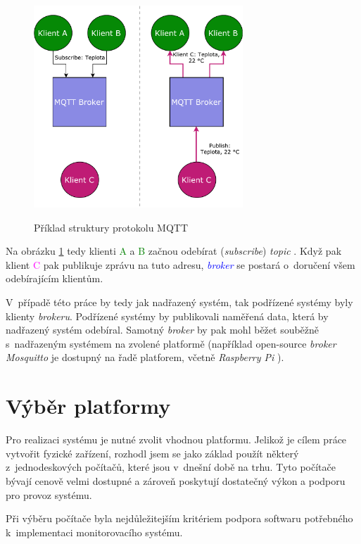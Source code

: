 \begin{figure}[h!]
    \centering
    \includegraphics[width=0.7\textwidth]{images/basic_mqtt.pdf}
    \label{fig:basic_mqtt}
    \caption[Příklad struktury protokolu MQTT]{Příklad struktury protokolu MQTT \cite{mqtt_eclipse}}
\end{figure}

Na obrázku \ref{fig:basic_mqtt} tedy klienti \textcolor{green}{A} a \textcolor{green}{B} začnou odebírat (\textit{subscribe}) \textit{topic} . Když pak klient \textcolor{magenta}{C} pak publikuje zprávu na tuto adresu, \textcolor{blue}{\textit{broker}} se postará o~doručení všem odebírajícím klientům.

V~případě této práce by tedy jak nadřazený systém, tak podřízené systémy byly klienty \textit{brokeru}. Podřízené systémy by publikovali naměřená data, která by nadřazený systém odebíral. Samotný \textit{broker} by pak mohl běžet souběžně s~nadřazeným systémem na zvolené platformě (například open-source \textit{broker Mosquitto} je dostupný na řadě platforem, včetně \textit{Raspberry Pi} \cite{mqtt_mosquitto_wiki}).

\section{Výběr platformy}

Pro realizaci systému je nutné zvolit vhodnou platformu. Jelikož je cílem práce vytvořit fyzické zařízení, rozhodl jsem se jako základ použít některý z~jednodeskových počítačů, které jsou v~dnešní době na trhu. Tyto počítače bývají cenově velmi dostupné a zároveň poskytují dostatečný výkon a podporu pro provoz systému.

Při výběru počítače byla nejdůležitejším kritériem podpora softwaru potřebného k~implementaci monitorovacího systému.